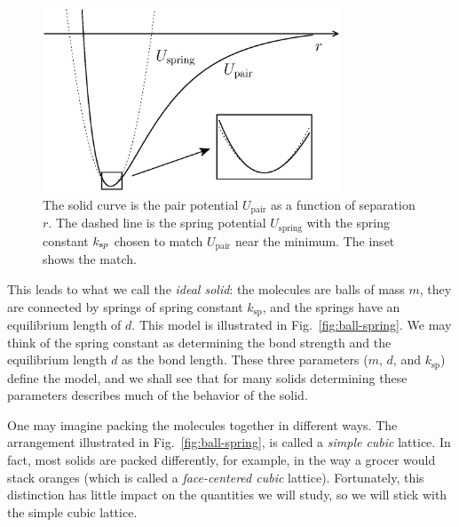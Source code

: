 
\begin{figure}
\begin{center}
\includegraphics[width=3.5in]{thermal_energy_and_solids/pair_potential_spring.eps}
\caption{The solid curve is the pair potential $U_\text{pair}$ as a
  function of separation $r$.  The dashed line is the spring potential
  $U_\text{spring}$ with the spring constant $k_{\text sp}$ chosen to match
  $U_\text{pair}$ near the minimum.  The inset shows the match.}
\label{fig:pair_potential_spring}
\end{center}
\end{figure}


This leads to what we call the {\it ideal solid}:
the molecules are balls of mass $m$, they are connected by springs of
spring constant $k_\text{sp}$, and the springs have an equilibrium length
of $d$.  This model is illustrated in Fig.~\ref{fig:ball-spring}.  We
may think of the spring constant as determining the bond strength and
the equilibrium length $d$ as the bond length.  These three parameters
($m$, $d$, and $k_\text{sp}$) define the model, and we shall see that for
many solids determining these parameters describes much of the
behavior of the solid.

One may imagine packing the molecules together in different ways.  The
arrangement illustrated in Fig.~\ref{fig:ball-spring}, is called a
{\it simple cubic} lattice.  In fact, most solids are packed
differently, for example, in the way a grocer would stack oranges
(which is called a {\it face-centered cubic} lattice).  Fortunately,
this distinction has little impact on the quantities we will study, so
we will stick with the simple cubic lattice.

